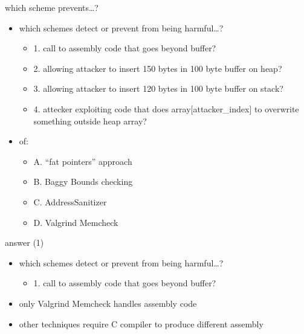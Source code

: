 \begin{frame}{which scheme prevents\ldots?}
\begin{itemize}
\item which schemes detect or prevent from being harmful\ldots?
    \begin{itemize}
    \item 1. call to assembly code that goes beyond buffer?
    \item 2. allowing attacker to insert 150 bytes in 100 byte buffer on heap?
    \item 3. allowing attacker to insert 120 bytes in 100 byte buffer on stack?
    \item 4. attecker exploiting code that does array[attacker\_index] to overwrite something outside heap array?
    \end{itemize}
\item of:
    \begin{itemize}
    \item A. ``fat pointers'' approach
    \item B. Baggy Bounds checking
    \item C. AddressSanitizer
    \item D. Valgrind Memcheck
    \end{itemize}
\end{itemize}
\end{frame}

\begin{frame}{answer (1)}
\begin{itemize}
\item which schemes detect or prevent from being harmful\ldots?
    \begin{itemize}
    \item 1. call to assembly code that goes beyond buffer?
    \end{itemize}
\item only Valgrind Memcheck handles assembly code
\item other techniques require C compiler to produce different assembly
\end{itemize}
\end{frame}

